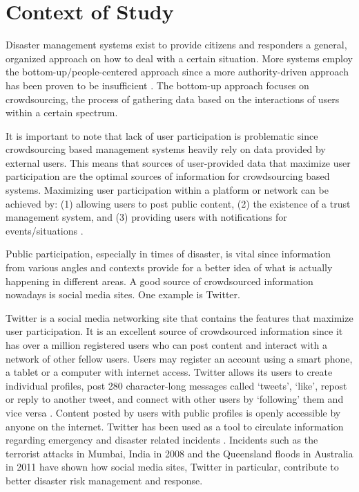 
\section{Context of Study}

Disaster management systems exist to provide citizens and responders a general, organized approach on how to deal with a certain situation. More systems employ the bottom-up/people-centered approach since a more authority-driven approach has been proven to be insufficient \cite{LEILIUZHANGWANYUEGUO2015, SCOLOBIGPRIORSCHRTERJRINPATT2015}. The bottom-up approach focuses on crowdsourcing, the process of gathering data based on the interactions of users within a certain spectrum.

It is important to note that lack of user participation is problematic since crowdsourcing based management systems heavily rely on data provided by external users. This means that sources of user-provided data that maximize user participation are the optimal sources of information for crowdsourcing based systems. Maximizing   user participation within a platform or network can be achieved by: (1) allowing users to post public content, (2) the existence of a trust management system, and (3) providing users with notifications for events/situations \cite{GOOLSBY2010, VICTORINOESTUARLAGMAY2016}.

Public participation, especially in times of disaster, is vital since information from various angles and contexts provide for a better idea of what is actually happening in different areas. A good source of crowdsourced information nowadays is social media sites. One example is Twitter.

Twitter is a social media networking  site that contains the features that maximize user participation. It is an excellent source of crowdsourced information since it has over a million registered users who can post content and interact with a network of other fellow users. Users may register an account using a smart phone, a tablet or a computer with internet access. Twitter allows its users to create individual profiles, post 280 character-long messages called ‘tweets’, ‘like’, repost or reply to another tweet, and connect with other users by ‘following’ them and vice versa \cite{VIEWEGSTARBIRDPALEN2010}. Content posted by users with public profiles is openly accessible by anyone on the internet. Twitter has been used as a tool to circulate information regarding emergency and disaster related incidents \cite{GOOLSBY2010, VIEWEGSTARBIRDPALEN2010, MCDOUGALL2011} .   Incidents such as the terrorist attacks in Mumbai, India in 2008 and the Queensland floods in Australia in 2011 have shown how social media sites, Twitter in particular, contribute to better disaster risk management and response.

